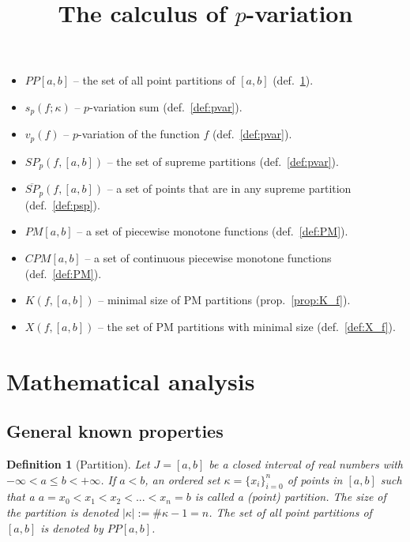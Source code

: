 \documentclass[12pt, a4paper]{article}
\title{The calculus of $p$-variation }
\newtheorem{definition}[theorem]{Definition}
\numberwithin{equation}{section}
\begin{document}
  \maketitle


\begin{itemize}  
  \item $PP[a,b]$ --  the set of all point partitions of $[a,b]$
    (def.~\ref{def:pp}).
  \item $s_{p}(f;\kappa)$ --  $p$-variation sum (def.~\ref{def:pvar}).
  \item $v_{p}\left( f\right)$ -- $p$-variation of the function $f$
    (def.~\ref{def:pvar}).
  \item $SP_{p}(f,[a,b])$ -- the set of supreme partitions
    (def.~\ref{def:pvar}).
  \item $\overline{SP}_{p}(f,[a,b])$ -- a set of points that are
    in any supreme partition (def.~\ref{def:psp}).
  \item $PM[a,b]$ -- a set of piecewise monotone functions
    (def.~\ref{def:PM}).  
  \item $CPM[a,b]$ -- a set of continuous piecewise monotone functions
    (def.~\ref{def:PM}).
  \item $K(f,[a,b])$ -- minimal size of PM partitions
    (prop.~\ref{prop:K_f}).
  \item $X(f,[a,b])$ -- the set of PM partitions with minimal size
    (def.~\ref{def:X_f}).
\end{itemize}   


\section{Mathematical analysis}

\subsection{General known properties}
  
  
\begin{definition}[Partition]\label{def:pp}
  Let $J = [a,b]$ be a closed interval of real numbers with 
  $-\infty < a \leq b <+\infty$. 
  If $a < b$, an ordered set $\kappa = \{x_{i}\}_{i=0}^{n}$ 
  of points in $[a,b]$ such that a  
  $a=x_{0}<x_{1}<x_{2}<...<x_{n}=b$ is called a \emph{(point) partition}. 
  The size of the partition is denoted $\left|\kappa \right| :=\#\kappa-1=n$. 
  The set of all point partitions of $[a,b]$ is denoted by $PP[a,b]$.  
\end{definition} 
 
\end{document}
